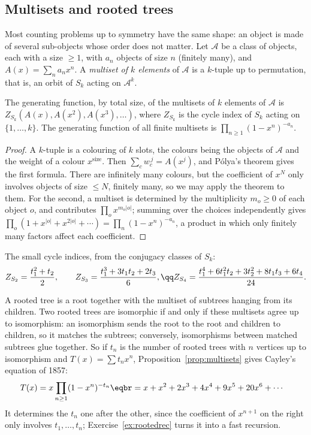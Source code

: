\subsection*{Multisets and rooted trees}

Most counting problems up to symmetry have the same shape: an object is made of several sub-objects whose order does not
matter. Let $\mathcal A$ be a class of objects, each with a size $\ge1$, with $a_n$ objects of size $n$ (finitely many), and $A(x)=\sum_na_nx^n$. A
\emph{multiset of $k$ elements} of $\mathcal A$ is a $k$-tuple up to permutation, that is, an orbit of $S_k$ acting on $\mathcal A^k$.

\begin{proposition}\label{prop:multisets}
The generating function, by total size, of the multisets of $k$ elements of $\mathcal A$ is $Z_{S_k}(A(x),A(x^2),A(x^3),\dots)$, where $Z_{S_k}$ is the
cycle index of $S_k$ acting on $\{1,\dots,k\}$. The generating function of all finite multisets is $\prod_{n\ge1}(1-x^n)^{-a_n}$.
\end{proposition}
\begin{proof}
A $k$-tuple is a colouring of $k$ slots, the colours being the objects of $\mathcal A$ and the weight of a colour $x^{\text{size}}$. Then $\sum_cw_c^{\,j}=A(x^j)$,
and P\'olya's theorem gives the first formula. There are infinitely many colours, but the coefficient of $x^N$ only involves
objects of size $\le N$, finitely many, so we may apply the theorem to them. For the second, a multiset is determined by the
multiplicity $m_o\ge0$ of each object $o$, and contributes $\prod_ox^{m_o|o|}$; summing over the choices independently gives
$\prod_o(1+x^{|o|}+x^{2|o|}+\cdots)=\prod_n(1-x^n)^{-a_n}$, a product in which only finitely many factors affect each coefficient.
\end{proof}

The small cycle indices, from the conjugacy classes of $S_k$:
\[
\begin{gathered}Z_{S_2}=\frac{t_1^2+t_2}2,\qquad Z_{S_3}=\frac{t_1^3+3t_1t_2+2t_3}6,\qq Z_{S_4}=\frac{t_1^4+6t_1^2t_2+3t_2^2+8t_1t_3+6t_4}{24}.\end{gathered}
\]

A rooted tree is a root together with the multiset of subtrees hanging from its children. Two rooted trees are isomorphic if and
only if these multisets agree up to isomorphism: an isomorphism sends the root to the root and children to children, so it
matches the subtrees; conversely, isomorphisms between matched subtrees glue together. So if $t_n$ is the number of rooted trees
with $n$ vertices up to isomorphism and $T(x)=\sum t_nx^n$, Proposition~\ref{prop:multisets} gives Cayley's equation of 1857:
\[
\begin{aligned}{}&T(x)=x\prod_{n\ge1}(1-x^n)^{-t_n}\eqbr=x+x^2+2x^3+4x^4+9x^5+20x^6+\cdots\end{aligned}
\]
It determines the $t_n$ one after the other, since the coefficient of $x^{n+1}$ on the right only involves $t_1,\dots,t_n$; Exercise~\ref{ex:rootedrec}
turns it into a fast recursion.

